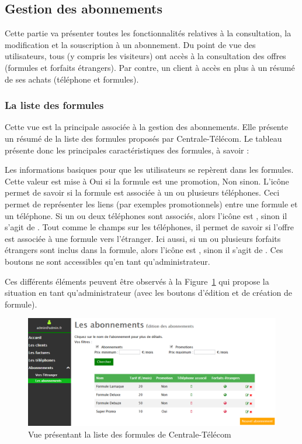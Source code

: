 \subsection{Gestion des abonnements}
Cette partie va présenter toutes les fonctionnalités relatives à la consultation, la modification et la souscription à un abonnement. Du point de vue des utilisateurs, tous (y compris les visiteurs) ont accès à la consultation des offres (formules et forfaits étrangers). Par contre, un client à accès en plus à un résumé de ses achats (téléphone et formules).

\subsubsection{La liste des formules}
Cette vue est la principale associée à la gestion des abonnements. Elle présente un résumé de la liste des formules proposés par Centrale-Télécom. Le tableau présente donc les principales caractéristiques des formules, à savoir :
\begin{itemize}
  Les informations basiques pour que les utilisateurs se repèrent dans les formules.
  Cette valeur est mise à \og Oui\fg{} si la formule est une promotion, \og Non\fg{} sinon.
  L'icône permet de savoir si la formule est associée à un ou plusieurs téléphones. Ceci permet de représenter les liens (par exemples promotionnels) entre une formule et un téléphone. Si un ou deux téléphones sont associés, alors l'icône est \vColor{\faMobilePhone}, sinon il s'agit de \thColor{\faMobilePhone}.
  Tout comme le champs sur les téléphones, il permet de savoir si l'offre est associée à une formule vers l'étranger. Ici aussi, si un ou plusieurs forfaits étrangers sont inclus dans la formule, alors l'icône est \vColor{\faGlobe}, sinon il s'agit de \thColor{\faGlobe}.
  Ces boutons ne sont accessibles qu'en tant qu'administrateur.
\end{itemize}
Ces différents éléments peuvent être observés à la Figure~\ref{fig:liste-formule} qui propose la situation en tant qu'administrateur (avec les boutons d'édition et de création de formule).

\begin{figure}[ht]
  \centering
  \includegraphics[width=.6\textwidth]{images/Plateforme/liste_formule}
  \caption{Vue présentant la liste des formules de Centrale-Télécom}
  \label{fig:liste-formule}
\end{figure}

